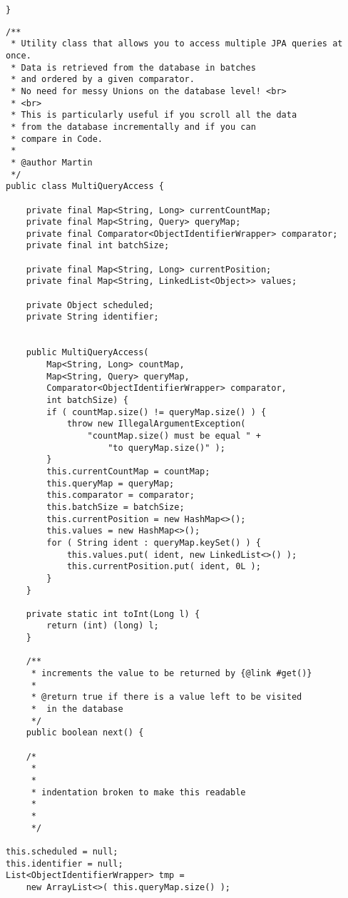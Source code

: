 \begin{lstlisting}[frame=htrbl, caption={generic JPA FullTextEntityManager}, label={lst:FullTextEntityManager.java_generic}]
}
\end{lstlisting}

\lstset{language=java}
\begin{lstlisting}[frame=htrbl, caption={MultiQueryAccess.java}, label={lst:MultiQueryAccess.java}]
/**
 * Utility class that allows you to access multiple JPA queries at once.
 * Data is retrieved from the database in batches
 * and ordered by a given comparator.
 * No need for messy Unions on the database level! <br>
 * <br>
 * This is particularly useful if you scroll all the data 
 * from the database incrementally and if you can 
 * compare in Code.
 *
 * @author Martin
 */
public class MultiQueryAccess {

	private final Map<String, Long> currentCountMap;
	private final Map<String, Query> queryMap;
	private final Comparator<ObjectIdentifierWrapper> comparator;
	private final int batchSize;
	
	private final Map<String, Long> currentPosition;
	private final Map<String, LinkedList<Object>> values;
	
	private Object scheduled;
	private String identifier;


	public MultiQueryAccess(
		Map<String, Long> countMap,
		Map<String, Query> queryMap,
		Comparator<ObjectIdentifierWrapper> comparator,
		int batchSize) {
		if ( countMap.size() != queryMap.size() ) {
			throw new IllegalArgumentException( 
				"countMap.size() must be equal " + 
					"to queryMap.size()" );
		}
		this.currentCountMap = countMap;
		this.queryMap = queryMap;
		this.comparator = comparator;
		this.batchSize = batchSize;
		this.currentPosition = new HashMap<>();
		this.values = new HashMap<>();
		for ( String ident : queryMap.keySet() ) {
			this.values.put( ident, new LinkedList<>() );
			this.currentPosition.put( ident, 0L );
		}
	}

	private static int toInt(Long l) {
		return (int) (long) l;
	}

	/**
	 * increments the value to be returned by {@link #get()}
	 *
	 * @return true if there is a value left to be visited 
	 *	in the database
	 */
	public boolean next() {
	
	/*
	 *
	 *
	 * indentation broken to make this readable
	 *
	 *
	 */
	
this.scheduled = null;
this.identifier = null;
List<ObjectIdentifierWrapper> tmp =
	new ArrayList<>( this.queryMap.size() );


\end{lstlisting}
